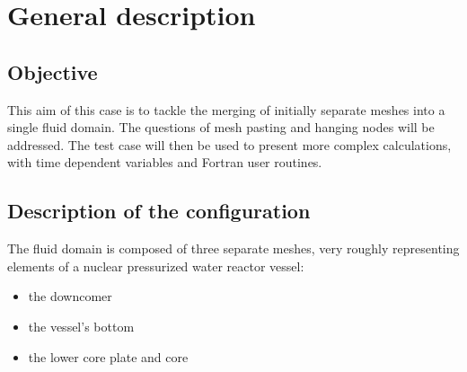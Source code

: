 %
%
%
%
%
%
%
\section{General description}

        \subsection{Objective}

This aim of this case is to tackle the merging of initially separate meshes into
a single fluid domain. The questions of mesh pasting and hanging nodes will be
addressed. The test case will then be used to present more complex calculations,
with time dependent variables and Fortran user routines.


        \subsection{Description of the configuration}

The fluid domain is composed of three separate meshes, very roughly representing
elements of a nuclear pressurized water reactor vessel:
\begin{itemize}
        \item the downcomer
        \item the vessel's bottom
        \item the lower core plate and core
\end{itemize}

